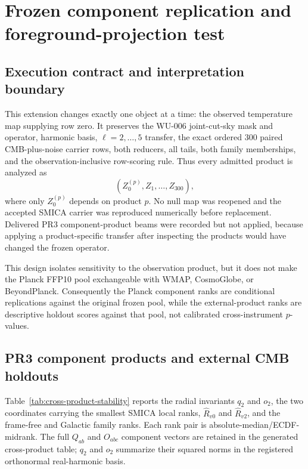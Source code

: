 \documentclass[11pt,a4paper]{article}
\begin{document}
\section{Frozen component replication and foreground-projection test}

\subsection{Execution contract and interpretation boundary}

This extension changes exactly one object at a time: the observed temperature
map supplying row zero.  It preserves the WU-006 joint-cut-sky mask and
operator, harmonic basis, $\ell=2,\ldots,5$ transfer, the exact ordered 300
paired CMB-plus-noise carrier rows, both reducers, all tails, both family
memberships, and the observation-inclusive row-scoring rule.  Thus every
admitted product is analyzed as
\[
  (Z_0^{(p)},Z_1,\ldots,Z_{300}),
\]
where only $Z_0^{(p)}$ depends on product $p$.  No null map was reopened and
the accepted SMICA carrier was reproduced numerically before replacement.
Delivered PR3 component-product beams were recorded but not applied, because
applying a product-specific transfer after inspecting the products would have
changed the frozen operator.

This design isolates sensitivity to the observation product, but it does not
make the Planck FFP10 pool exchangeable with WMAP, CosmoGlobe, or BeyondPlanck.
Consequently the Planck component ranks are conditional replications against
the original frozen pool, while the external-product ranks are descriptive
holdout scores against that pool, not calibrated cross-instrument $p$-values.

\subsection{PR3 component products and external CMB holdouts}

Table~\ref{tab:cross-product-stability} reports the radial invariants $q_2$
and $o_2$, the two coordinates carrying the smallest SMICA local ranks,
$\widehat R_{v0}$ and $\widehat R_{v2}$, and the frame-free and Galactic
family ranks.  Each rank pair is absolute-median/ECDF-midrank.  The full
$Q_{ab}$ and $O_{abc}$ component vectors are retained in the generated
cross-product table; $q_2$ and $o_2$ summarize their squared norms in the
registered orthonormal real-harmonic basis.
\end{document}
